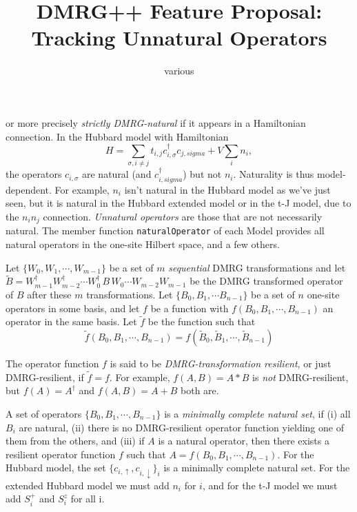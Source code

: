 \documentclass{article}
\begin{document}
\title{DMRG++ Feature Proposal:\\
Tracking Unnatural Operators}
\author{various}
\maketitle

 or
more precisely \emph{strictly DMRG-natural}
if it appears in a Hamiltonian connection. In the Hubbard model
with Hamiltonian
\begin{equation}
H=\sum_{\sigma, i\neq j}t_{i,j} c^\dagger_{i,\sigma} c_{j,sigma} + V\sum_i n_i,
\end{equation}
the operators $c_{i,\sigma}$ are natural (and $c^\dagger_{i,sigma}$) 
but not $n_i$.
Naturality is thus model-dependent.
For example, $n_i$ isn't natural in the Hubbard model as we've just
seen, but it is natural
in the Hubbard extended model or in the t-J model, due to the $n_i n_j$ connection.
\emph{Unnatural operators} are those that are not necessarily natural.
 The member function \texttt{naturalOperator}
of each Model provides all natural operators
in the one-site Hilbert space, and a few others.

Let $\{W_0, W_1, \cdots, W_{m-1}\}$ be a set of $m$ \emph{sequential} DMRG 
 transformations and let 
 $\tilde{B} = 
 W^\dagger_{m-1} W^\dagger_{m-2}\cdots W^\dagger_0\, B\, W_0\cdots W_{m-2} W_{m-1}$ be
 the DMRG transformed operator of $B$ after these $m$ transformations.
Let $\{B_0, B_1, \cdots B_{n-1}\}$ be a set
of $n$ one-site operators in some basis, and let $f$ be a function with
$f(B_0, B_1, \cdots, B_{n-1})$ an operator in the same basis.
Let $\tilde{f}$ be the function such that
\begin{equation}
\tilde{f}(B_0, B_1, \cdots, B_{n-1}) = 
f(\tilde{B}_0, \tilde{B}_1, \cdots, \tilde{B}_{n-1})
\end{equation}

The operator function $f$ is said to be \emph{DMRG-transformation resilient},
or just DMRG-resilient, if $\tilde{f}=f$.
For example, $f(A,B) = A*B$ is \emph{not} DMRG-resilient,
but  $f(A) = A^\dagger$ and
$f(A,B) = A + B$ both are.

A set of operators $\{B_0, B_1, \cdots, B_{n-1}\}$ is a \emph{minimally complete
natural set}, if (i) all $B_i$ are natural, (ii) there is no DMRG-resilient operator
function yielding one of them from the others, and (iii) if $A$ is a 
natural operator, then there exists 
a resilient operator function $f$ such that
$A = f(B_0, B_1, \cdots, B_{n-1})$.
For the Hubbard model, the set $\{c_{i, \uparrow}, c_{i, \downarrow}\}_i$ is 
a minimally complete natural set. For the extended Hubbard model we must
add $n_i$ for $i$, and for the t-J model we must add $S^+_i$ and $S^z_i$ for all i.
\end{document}
